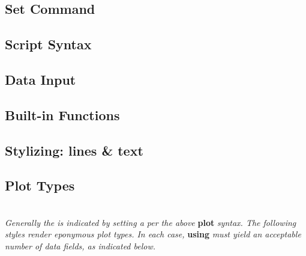 \subsection*{Set Command}


\subsection*{Script Syntax}





\subsection*{Data Input}



\subsection*{Built-in Functions}


\subsection*{Stylizing: lines \& text}


\subsection*{Plot Types}
\\
\textit{Generally the  is indicated by setting a  per the above }\textbf{plot}\textit{ syntax. The following styles render eponymous plot types. In each case, }\textbf{using}\textit{ must yield an acceptable number of data fields, as indicated below.}

